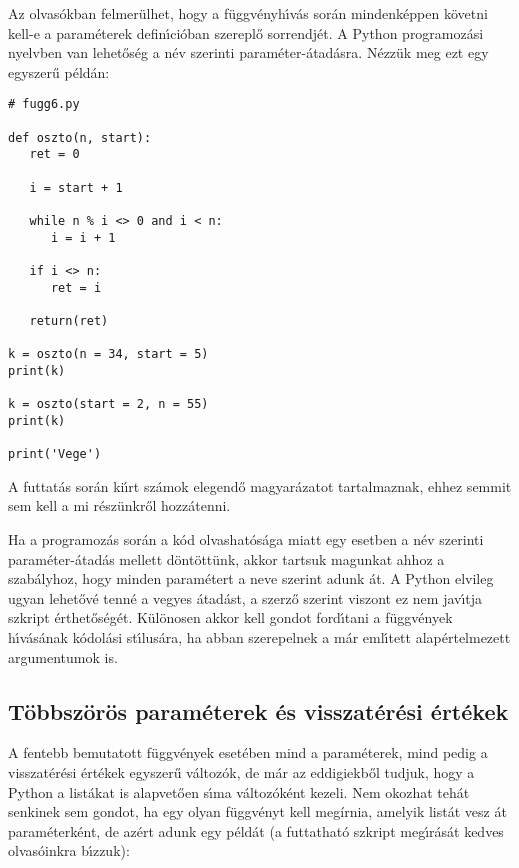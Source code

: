 \documentclass[12pt]{article}
\begin{document}
Az olvas\'okban felmer\"ulhet, hogy a f\"uggv\'enyh\'{\i}v\'as sor\'an mindenk\'eppen k\"ovetni kell-e a 
param\'eterek defin\'{\i}ci\'oban szerepl\H{o} sorrendj\'et. A Python programoz\'asi nyelvben van 
lehet\H{o}s\'eg a n\'ev szerinti param\'eter-\'atad\'asra. N\'ezz\"uk meg ezt egy egyszer\H{u} 
p\'eld\'an:

\begin{Verbatim}[fontsize=\small]
# fugg6.py

def oszto(n, start):
   ret = 0

   i = start + 1

   while n % i <> 0 and i < n:
      i = i + 1

   if i <> n:
      ret = i

   return(ret)

k = oszto(n = 34, start = 5)
print(k)

k = oszto(start = 2, n = 55)
print(k)

print('Vege')  
\end{Verbatim}

A futtat\'as sor\'an ki\'{\i}rt sz\'amok elegend\H{o} magyar\'azatot tartalmaznak, ehhez semmit sem kell a mi 
r\'esz\"unkr\H{o}l hozz\'atenni. 


Ha a programoz\'as sor\'an a k\'od olvashat\'os\'aga miatt egy esetben a n\'ev szerinti param\'eter-\'atad\'as 
mellett d\"ont\"ott\"unk, akkor tartsuk magunkat ahhoz a szab\'alyhoz, hogy minden param\'etert a neve szerint 
adunk \'at. A Python elvileg ugyan lehet\H{o}v\'e tenn\'e a vegyes \'atad\'ast, a szerz\H{o} szerint viszont 
ez nem jav\'{\i}tja szkript \'erthet\H{o}s\'eg\'et.  K\"ul\"onosen akkor kell gondot ford\'{\i}tani a 
f\"uggv\'enyek  h\'{\i}v\'as\'anak k\'odol\'asi st\'{\i}lus\'ara, ha abban szerepelnek a m\'ar eml\'{\i}tett 
alap\'ertelmezett argumentumok is. 

\subsection{T\"obbsz\"or\"os param\'eterek \'es visszat\'er\'esi \'ert\'ekek}

A fentebb bemutatott f\"uggv\'enyek eset\'eben mind a param\'eterek, mind pedig a visszat\'er\'esi \'ert\'ekek 
egyszer\H{u} v\'altoz\'ok, de m\'ar az eddigiekb\H{o}l tudjuk, hogy a Python a list\'akat is alapvet\H{o}en 
s\'{\i}ma v\'altoz\'ok\'ent kezeli. Nem okozhat teh\'at senkinek sem gondot, ha egy olyan f\"uggv\'enyt kell 
meg\'{i}rnia, amelyik list\'at vesz \'at param\'eterk\'ent, de az\'ert adunk egy p\'eld\'at (a futtathat\'o 
szkript meg\'{\i}r\'as\'at kedves olvas\'oinkra b\'{\i}zzuk):
\end{document}
